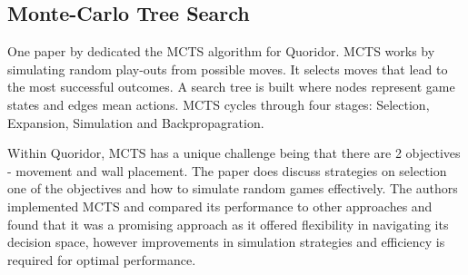 \documentclass[review]{cmpreport}
\begin{document}
\subsection{Monte-Carlo Tree Search}

One paper by \cite{respall2018monte} dedicated the MCTS algorithm for Quoridor. MCTS works by simulating random play-outs from possible moves. It selects moves that lead to the most successful outcomes. A search tree is built where nodes represent game states and edges mean actions. MCTS cycles through four stages: Selection, Expansion, Simulation and Backpropagration.

\noindent Within Quoridor, MCTS has a unique challenge being that there are 2 objectives - movement and wall placement. The paper does discuss strategies on selection one of the objectives and how to simulate random games effectively. The authors implemented MCTS and compared its performance to other approaches and found that it was a promising approach as it offered flexibility in navigating its decision space, however improvements in simulation strategies and efficiency is required for optimal performance.


\end{document}
